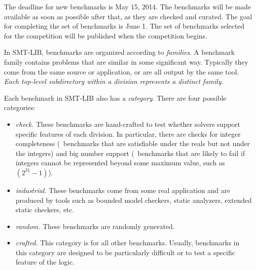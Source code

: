 \documentclass[12pt]{article}
\begin{document}
The deadline for new benchmarks is May 15, 2014.
The benchmarks will be made available as soon as possible after that, as they are checked and curated.
The goal for completing the set of benchmarks is June 1.
The set of benchmarks selected for the competition will be published when the
competition begins.

In SMT-LIB, benchmarks are organized according to \emph{families}.  A benchmark
family contains problems that are similar in some significant way.  Typically
they come from the same source or application, or are all output by the same
tool.  \emph{Each top-level subdirectory within a division represents a distinct
family.}  
%

Each benchmark in SMT-LIB also has a \emph{category}.  There are four possible
categories:
%
\begin{itemize}
\item \emph{check.} These benchmarks are hand-crafted to test whether
  solvers support specific features of each division.  In particular,
  there are checks for integer completeness (\ie\ benchmarks that are
  satisfiable under the reals but not under the integers) and big
  number support (\ie\ benchmarks that are likely to fail if integers
  cannot be represented beyond some maximum value, such as
  $(2^{31}-1)$).

  
\item \emph{industrial.} These benchmarks come from some real application
      and are produced by tools such as bounded model checkers, static analyzers, extended
      static checkers, etc.
\item \emph{random.} These benchmarks are randomly generated.
\item \emph{crafted.} This category is for all other benchmarks.  Usually,
  benchmarks in this category are designed to be particularly difficult or to
  test a specific feature of the logic.
\end{itemize}
\end{document}

